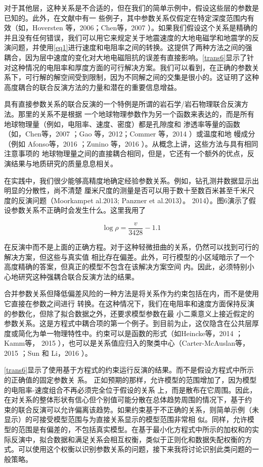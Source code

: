 对于其他层，这种关系是不合适的，但在我们的简单示例中，假设这些层的参数是已知的。此外，在文献中有一 些例子，其中参数关系仅假定在特定深度范围内有效（如，Hoversten 等，2006；Chen等，2007 ）。如果我们假设这个关系是精确的并且没有任何错误，我们可以用它来规定关于地震速度的大地电磁学和地震学的反演问题，并使用\ref{eq1}进行速度和电阻率之间的转换。这提供了两种方法之间的强耦合，因为层中速度的变化对大地电磁阻抗的误差有直接影响。\ref{trans6}显示了针对这种情况的电阻率和厚度方面的可行解决方案。我们可以看到，在正确的参数关系下，可行解的解空间受到限制，因为不同解之间的交集是很小的。这证明了这种高度耦合的联合反演方法的力量和潜在的重要信息增益。


具有直接参数关系的联合反演的一个特例是所谓的岩石学/岩石物理联合反演方法。那里的关系不是根据 一个地球物理参数作为另一个函数来表达的，而是所有地球物理量（例如，电阻率、速度、密度）都是孔隙度和 渗透率等量的函数（如，Chen等，2007 ；Gao 等，2012；Commer 等，2014 ）或温度和地 幔成分（例如 Afonso等，2016 ；Zunino 等，2016 ）。从概念上讲，这些方法与具有相同注意事项的 地球物理量之间的直接耦合相同，但是，它还有一个额外的优点，反演结果与地质研究的质量息息相关。

在实践中，我们很少能够高精度地确定经验参数关系。例如，钻孔测井数据显示出明显的分散性，尚不清楚 厘米尺度的测量是否可以用于数十至数百米甚至千米尺度的反演问题（Moorkampet al.2013; Panzner et al.2013）。 2014）。图6演示了假设参数关系不正确时会发生什么。这里我用了

\begin{equation}
    \log \rho=\frac{v}{3428}-1.1
\end{equation}

在反演中而不是上面的正确方程。对于这种轻微扭曲的关系，仍然可以找到可行的解决方案，但这些与真实值 相比存在偏差。此外，可行模型的小区域暗示了一个高度精确的答案，但真正的模型不包含在该解决方案空间 内。因此，必须特别小心地研究这种强耦合联合反演方法的结果。

合并参数关系但降低偏差风险的一种方法是将关系作为约束包括在内，而不是使用它直接在参数之间进行 转换。在这种情况下，我们在电阻率和速度方面保持反演的参数化，但除了拟合数据之外，还要求模型参数在最 小二乘意义上接近假定的参数关系。这是方程式中耦合项的第一个例子。到目前为止，这仅隐含在公共层厚 度或简化为单一物理特性中。约束可以是函数的形式（如Heincke等，2014 ；Kamm等， 2015 ），也可以是关系值应归入的聚类中心（Carter-McAuslan等，2015 ；Sun 和 Li，2016 ）。

\ref{trans6}显示了使用基于方程式的约束运行反演的结果。而不是假设方程式中所示的正确值的固定参数关 系。 正如预期的那样，允许模型的范围增加了，因为模型的电阻率-速度组合不再必须完全位于假设的关系 上，而是散布在它周围。因此，在对关系的整体形状有信心但个别值可能分散在总体趋势周围的情况下，基于约 束的联合反演可以允许偏离该趋势。如果约束基于不正确的关系，则简单示例（未显示）的可接受模型范围与为直接关系显示的模型范围非常相 似。同样，允许模型的范围是有偏差的，不包括真实模型。在基于最小化方程式中所示的加权和的实际反演中，拟合数据和满足关系会相互权衡，类似于正则化和数据失配权衡的方式。可以使用这个权衡以识别参数关系的问题，接下来我将讨论识别此类问题的一般策略。

